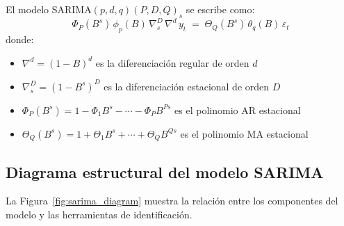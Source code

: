 \documentclass[12pt,a4paper]{article}
\begin{document}
El modelo SARIMA$(p,d,q)(P,D,Q)_s$ se escribe como:
\begin{equation}
  \Phi_P(B^s)\,\phi_p(B)\,\nabla^D_s\,\nabla^d\, y_t
  \;=\;
  \Theta_Q(B^s)\,\theta_q(B)\,\varepsilon_t
\end{equation}
donde:
\begin{itemize}
  \item $\nabla^d = (1-B)^d$ es la diferenciación regular de orden $d$
  \item $\nabla^D_s = (1-B^s)^D$ es la diferenciación estacional de orden $D$
  \item $\Phi_P(B^s) = 1 - \Phi_1 B^s - \cdots - \Phi_P B^{Ps}$ es el polinomio AR estacional
  \item $\Theta_Q(B^s) = 1 + \Theta_1 B^s + \cdots + \Theta_Q B^{Qs}$ es el polinomio MA estacional
\end{itemize}

\subsection{Diagrama estructural del modelo SARIMA}

La Figura~\ref{fig:sarima_diagram} muestra la relación entre los componentes del modelo
y las herramientas de identificación.
\end{document}
